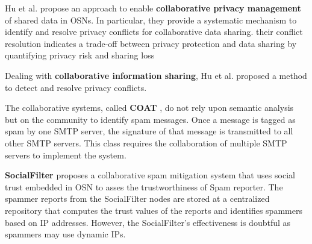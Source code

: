 Hu et al. \cite{hu_detecting_2011} propose an approach to enable \textbf{collaborative privacy management} of shared data in OSNs.
In particular,
	they provide a systematic mechanism to identify and resolve privacy conflicts for collaborative data sharing.
their conflict resolution indicates a trade-off between privacy protection and data sharing by quantifying privacy risk and sharing loss

Dealing with \textbf{collaborative information sharing},
	Hu et al. \cite{biczok_interdependent_2013} proposed a method to detect and resolve privacy conflicts.

The collaborative systems, called \textbf{COAT} \cite{ahmad_coat_2012}, do not rely upon semantic analysis but on the community to identify spam messages.
Once a message is tagged as spam by one SMTP server,
	the signature of that message is transmitted to all other SMTP servers.
This class requires the collaboration of multiple SMTP servers to implement the system.

\textbf{SocialFilter} \cite{yang_socialfilter_2009} proposes a collaborative spam mitigation system that uses social trust embedded in OSN to asses the trustworthiness of Spam reporter.
The spammer reports from the SocialFilter nodes are stored at a centralized repository that computes the trust values of the reports and identifies spammers based on IP addresses.
However,
	the SocialFilter’s effectiveness is doubtful as spammers may use dynamic IPs.



